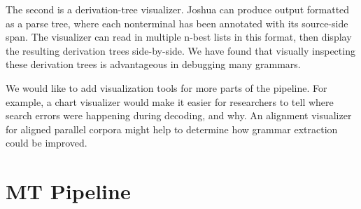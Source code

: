 \documentclass[11pt]{article}
\begin{document}
The second is a derivation-tree visualizer. Joshua can produce output formatted
as a parse tree, where each nonterminal has been annotated with its source-side
span. The visualizer can read in multiple n-best lists in this format, then
display the resulting derivation trees side-by-side. We have found that
visually inspecting these derivation trees is advantageous in debugging many
grammars.

We would like to add visualization tools for more parts of the pipeline. For
example, a chart visualizer would make it easier for researchers to tell where
search errors were happening during decoding, and why. An alignment visualizer
for aligned parallel corpora might help to determine how grammar extraction 
could be improved.


\section{MT Pipeline}



\end{document}
